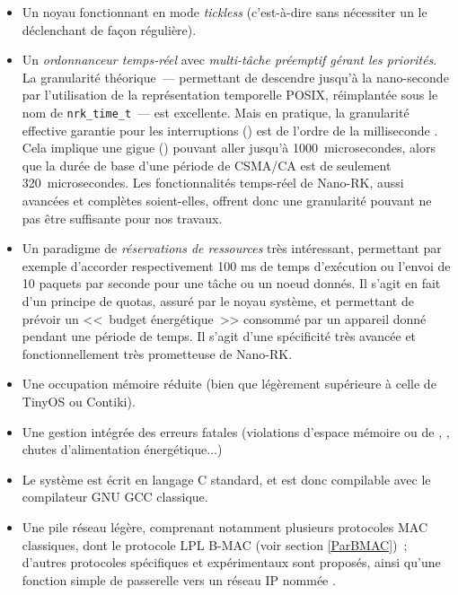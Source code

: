 \begin{itemize}

\item Un noyau fonctionnant en mode \emph{tickless} (c'est-à-dire sans
nécessiter un  le déclenchant de façon régulière).

\item Un \emph{ordonnanceur temps-réel} avec \emph{multi-tâche préemptif
gérant les priorités}.\\
La granularité théorique~--- permettant de descendre jusqu'à la nano-seconde
par l'utilisation de la représentation temporelle POSIX, réimplantée sous
le nom de \texttt{nrk\_time\_t}~--- est excellente. Mais en pratique, la
granularité effective garantie pour les interruptions () est de l'ordre de la milliseconde \cite{NanoRKTimeMgt}.
Cela implique une gigue () pouvant aller jusqu'à
1000~microsecondes, alors que la durée de base d'une période de
 CSMA/CA est de seulement 320~microsecondes.
Les fonctionnalités temps-réel de Nano-RK, aussi avancées et complètes
soient-elles, offrent donc une granularité pouvant ne pas être suffisante
pour nos travaux.

\item Un paradigme de \emph{réservations de ressources } très intéressant,
permettant par exemple d'accorder respectivement 100 ms de temps d'exécution
ou l'envoi de 10 paquets par seconde pour une tâche ou un noeud donnés.
Il s'agit en fait d'un principe de quotas, assuré par le noyau système,
et permettant de prévoir un <<~budget énergétique~>> consommé par un
appareil donné pendant une période de temps. Il s'agit d'une spécificité
très avancée et fonctionnellement très prometteuse de Nano-RK.

\item Une occupation mémoire réduite (bien que légèrement supérieure
à celle de TinyOS ou Contiki).

\item Une gestion intégrée des erreurs fatales (violations d'espace
mémoire ou de , , chutes d'alimentation
énergétique...)

\item Le système est écrit en langage C standard, et est donc compilable
avec le compilateur GNU GCC classique.

\item Une pile réseau légère, comprenant notamment plusieurs protocoles
MAC classiques, dont le protocole LPL B-MAC (voir section
\vref{ParBMAC})~; d'autres protocoles spécifiques et expérimentaux
sont proposés, ainsi qu'une fonction simple de passerelle vers
un réseau IP nommée .

\end{itemize}

